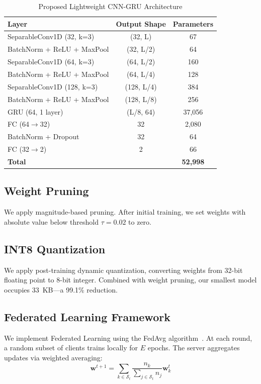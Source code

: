 \documentclass[preprint,12pt]{elsarticle}
\begin{document}
\begin{table}[hbt]
\centering
\caption{Proposed Lightweight CNN-GRU Architecture}
\label{tab:lightweight}
\begin{tabular}{lcc}
\toprule
Layer & Output Shape & Parameters \\
\midrule
SeparableConv1D (32, k=3) & (32, L) & 67 \\
BatchNorm + ReLU + MaxPool & (32, L/2) & 64 \\
SeparableConv1D (64, k=3) & (64, L/2) & 160 \\
BatchNorm + ReLU + MaxPool & (64, L/4) & 128 \\
SeparableConv1D (128, k=3) & (128, L/4) & 384 \\
BatchNorm + ReLU + MaxPool & (128, L/8) & 256 \\
GRU (64, 1 layer) & (L/8, 64) & 37,056 \\
FC (64$\rightarrow$32) & 32 & 2,080 \\
BatchNorm + Dropout & 32 & 64 \\
FC (32$\rightarrow$2) & 2 & 66 \\
\midrule
\textbf{Total} & & \textbf{52,998} \\
\bottomrule
\end{tabular}
\end{table}

\subsection{Weight Pruning}
\label{sec:pruning}

We apply magnitude-based pruning. After initial training, we set weights with absolute value below threshold $\tau=0.02$ to zero.

\subsection{INT8 Quantization}
\label{sec:quantization}

We apply post-training dynamic quantization, converting weights from 32-bit floating point to 8-bit integer. Combined with weight pruning, our smallest model occupies 33~KB---a 99.1\% reduction.

\subsection{Federated Learning Framework}
\label{sec:fl}

We implement Federated Learning using the FedAvg algorithm~\cite{mcmahan2017communication}. At each round, a random subset of clients trains locally for $E$ epochs. The server aggregates updates via weighted averaging:
\begin{equation}
\mathbf{w}^{t+1} = \sum_{k \in \mathcal{S}_t} \frac{n_k}{\sum_{j \in \mathcal{S}_t} n_j} \mathbf{w}_k^t
\label{eq:fedavg}
\end{equation}
\end{document}
